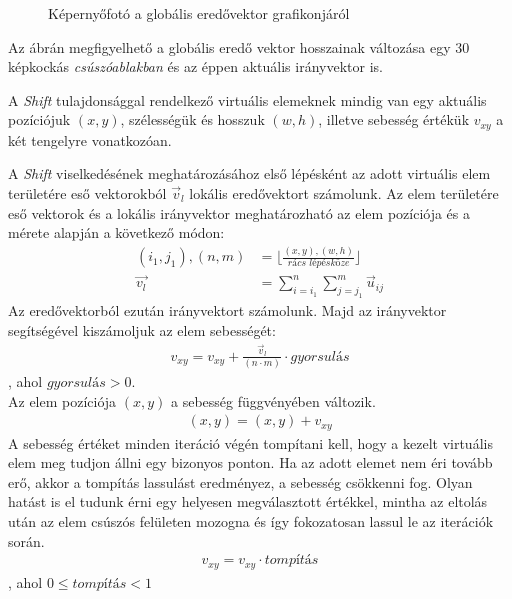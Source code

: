 \begin{figure}[h]
\centering
{}
\caption{Képernyőfotó a globális eredővektor grafikonjáról}
\label{fig:resultantplot}
\end{figure}

Az ábrán megfigyelhető a globális eredő vektor hosszainak változása egy 30 képkockás \textit{csúszóablakban} és az éppen aktuális irányvektor is.


A \textit{Shift} tulajdonsággal rendelkező virtuális elemeknek mindig van egy aktuális pozíciójuk $(x,y)$, szélességük és hosszuk $(w,h)$, illetve sebesség értékük $v_{xy}$ a két tengelyre vonatkozóan.

A \textit{Shift} viselkedésének meghatározásához első lépésként az adott virtuális elem területére eső vektorokból $\vec{v}_l$  lokális eredővektort számolunk. Az elem területére eső vektorok és a lokális irányvektor meghatározható az elem pozíciója és a mérete alapján a következő módon:
\begin{align*}
  (i_1, j_1), (n, m) &= \lfloor \frac{(x,y),(w,h)}{\textit{rács lépésköze}} \rfloor\\
  \vec{v_l} &= \sum_{i=i_1}^n \sum_{j=j_1}^m \vec{u}_{ij}
\end{align*}
Az eredővektorból ezután irányvektort számolunk. Majd az irányvektor segítségével kiszámoljuk az elem sebességét:
\begin{align*}
  v_{xy} = v_{xy} + \frac{\vec{v}_l}{(n \cdot m)} \cdot \textit{gyorsulás}
\end{align*}
, ahol $\textit{gyorsulás} > 0$.\\
Az elem pozíciója $(x,y)$ a sebesség függvényében változik.
\begin{align*}
  (x,y) = (x,y)+v_{xy}
\end{align*}
A sebesség értéket minden iteráció végén tompítani kell, hogy a kezelt virtuális elem meg tudjon állni egy bizonyos ponton. Ha az adott elemet nem éri tovább erő, akkor a tompítás lassulást eredményez, a sebesség csökkenni fog. Olyan hatást is el tudunk érni egy helyesen megválasztott értékkel, mintha az eltolás után az elem csúszós felületen mozogna és így fokozatosan lassul le az iterációk során.
\begin{align*}
  v_{xy} = v_{xy} \cdot \textit{tompítás}
\end{align*}
, ahol $0 \leq \textit{tompítás} < 1$

